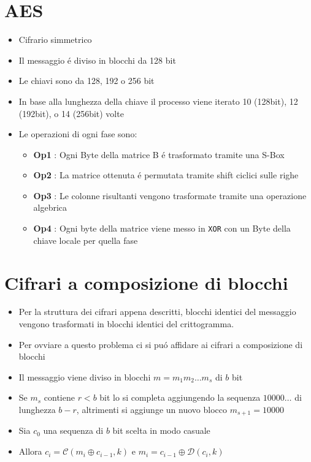 \section{AES}

\begin{itemize}
    \item Cifrario simmetrico
    \item Il messaggio \'e diviso in blocchi da 128 bit
    \item Le chiavi sono da 128, 192 o 256 bit
    \item In base alla lunghezza della chiave il processo viene iterato 10 (128bit), 12 (192bit), o 14 (256bit) volte
    \item Le operazioni di ogni fase sono:
    \begin{itemize}
        \item \textbf{Op1} : Ogni Byte della matrice B \'e trasformato tramite una S-Box
        \item \textbf{Op2} : La matrice ottenuta \'e permutata tramite shift ciclici sulle righe
        \item \textbf{Op3} : Le colonne risultanti vengono trasformate tramite una operazione algebrica
        \item \textbf{Op4} : Ogni byte della matrice viene messo in \texttt{XOR} con un Byte della chiave locale per quella fase
    \end{itemize}
\end{itemize}

\section{Cifrari a composizione di blocchi}

\begin{itemize}
    \item Per la struttura dei cifrari appena descritti, blocchi identici del messaggio vengono trasformati in blocchi identici del crittogramma.
    \item Per ovviare a questo problema ci si pu\'o affidare ai cifrari a composizione di blocchi
    \item Il messaggio viene diviso in blocchi $m = m_1m_2\dots m_s$ di $b$ bit
    \item Se $m_s$ contiene $r < b$ bit lo si completa aggiungendo la sequenza $10000\dots$ di lunghezza $b - r$, altrimenti si aggiunge un nuovo blocco $m_{s+1} = 10000$
    \item Sia $c_0$ una sequenza di $b$ bit scelta in modo casuale
    \item Allora $c_i = \mathcal{C}(m_i \oplus c_{i-1}, k)$ e $m_i = c_{i-1} \oplus \mathcal{D}(c_i, k)$
\end{itemize}